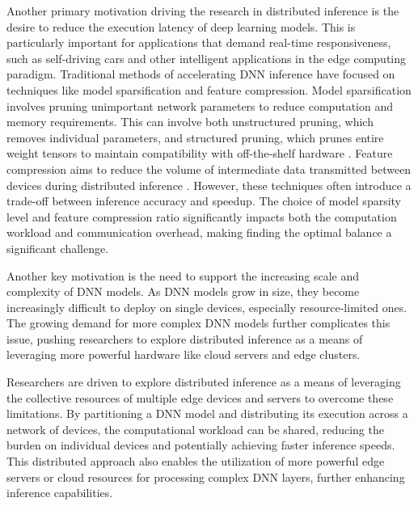 \documentclass[conference]{IEEEtran}
\begin{document}
Another primary motivation driving the research in distributed inference is the desire to reduce the execution latency of deep learning models. This is particularly important for applications that demand real-time responsiveness, such as self-driving cars and other intelligent applications in the edge computing paradigm. Traditional methods of accelerating DNN inference have focused on techniques like model sparsification and feature compression. Model sparsification involves pruning unimportant network parameters to reduce computation and memory requirements. This can involve both unstructured pruning, which removes individual parameters, and structured pruning, which prunes entire weight tensors to maintain compatibility with off-the-shelf hardware \cite{zou2021cap}. Feature compression aims to reduce the volume of intermediate data transmitted between devices during distributed inference \cite{zhang2021communication}. However, these techniques often introduce a trade-off between inference accuracy and speedup. The choice of model sparsity level and feature compression ratio significantly impacts both the computation workload and communication overhead, making finding the optimal balance a significant challenge.

Another key motivation is the need to support the increasing scale and complexity of DNN models. As DNN models grow in size, they become increasingly difficult to deploy on single devices, especially resource-limited ones. The growing demand for more complex DNN models further complicates this issue, pushing researchers to explore distributed inference as a means of leveraging more powerful hardware like cloud servers and edge clusters.



Researchers are driven to explore distributed inference as a means of leveraging the collective resources of multiple edge devices and servers to overcome these limitations. By partitioning a DNN model and distributing its execution across a network of devices, the computational workload can be shared, reducing the burden on individual devices and potentially achieving faster inference speeds. This distributed approach also enables the utilization of more powerful edge servers or cloud resources for processing complex DNN layers, further enhancing inference capabilities.
\end{document}
